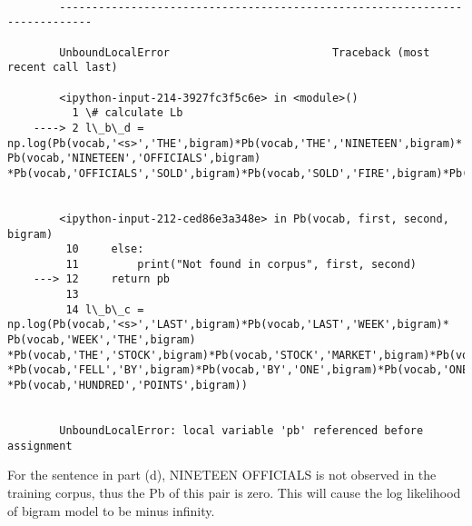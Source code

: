 \documentclass[11pt]{article}
\begin{document}
    \begin{Verbatim}[commandchars=\\\{\}]

        ---------------------------------------------------------------------------

        UnboundLocalError                         Traceback (most recent call last)

        <ipython-input-214-3927fc3f5c6e> in <module>()
          1 \# calculate Lb
    ----> 2 l\_b\_d = np.log(Pb(vocab,'<s>','THE',bigram)*Pb(vocab,'THE','NINETEEN',bigram)* Pb(vocab,'NINETEEN','OFFICIALS',bigram)           *Pb(vocab,'OFFICIALS','SOLD',bigram)*Pb(vocab,'SOLD','FIRE',bigram)*Pb(vocab,'FIRE','INSURANCE',bigram))
    

        <ipython-input-212-ced86e3a348e> in Pb(vocab, first, second, bigram)
         10     else:
         11         print("Not found in corpus", first, second)
    ---> 12     return pb
         13 
         14 l\_b\_c = np.log(Pb(vocab,'<s>','LAST',bigram)*Pb(vocab,'LAST','WEEK',bigram)* Pb(vocab,'WEEK','THE',bigram)           *Pb(vocab,'THE','STOCK',bigram)*Pb(vocab,'STOCK','MARKET',bigram)*Pb(vocab,'MARKET','FELL',bigram)           *Pb(vocab,'FELL','BY',bigram)*Pb(vocab,'BY','ONE',bigram)*Pb(vocab,'ONE','HUNDRED',bigram)           *Pb(vocab,'HUNDRED','POINTS',bigram))


        UnboundLocalError: local variable 'pb' referenced before assignment

    \end{Verbatim}

    For the sentence in part (d), NINETEEN OFFICIALS is not observed in the
training corpus, thus the Pb of this pair is zero. This will cause the
log likelihood of bigram model to be minus infinity.


    
    
    
    
\end{document}
